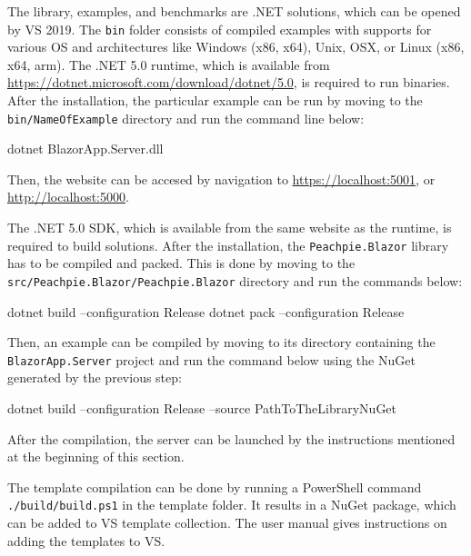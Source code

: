 \documentclass[12pt,a4paper]{report}
\let\openright=\clearpage
\begin{document}
The library, examples, and benchmarks are .NET solutions, which can be opened by \ac{VS} 2019.
The \texttt{bin} folder consists of compiled examples with supports for various OS and architectures like Windows (x86, x64), Unix, OSX, or Linux (x86, x64, arm).
The .NET 5.0 runtime, which is available from \url{https://dotnet.microsoft.com/download/dotnet/5.0}, is required to run binaries.
After the installation, the particular example can be run by moving to the \texttt{bin/NameOfExample} directory and run the command line below:
\par
\begin{code}[frame=none]
dotnet BlazorApp.Server.dll
\end{code}
\par
Then, the website can be accesed by navigation to \url{https://localhost:5001}, or \url{http://localhost:5000}.
\par
The .NET 5.0 SDK, which is available from the same website as the runtime, is required to build solutions.
After the installation, the \texttt{Peachpie.Blazor} library has to be compiled and packed. 
This is done by moving to the \texttt{src/Peachpie.Blazor/Peachpie.Blazor} directory and run the commands below:
\par
\begin{code}[frame=none]
dotnet build --configuration Release
dotnet pack --configuration Release
\end{code}
\par
Then, an example can be compiled by moving to its directory containing the \texttt{BlazorApp.Server} project and run the command below using the NuGet generated by the previous step:
\par
\begin{code}[frame=none]
dotnet build --configuration Release --source PathToTheLibraryNuGet
\end{code}
\par
After the compilation, the server can be launched by the instructions mentioned at the beginning of this section.
\par
The template compilation can be done by running a PowerShell command \texttt{./build/build.ps1} in the template folder.
It results in a NuGet package, which can be added to VS template collection.
The user manual gives instructions on adding the templates to VS.

\openright
\end{document}
